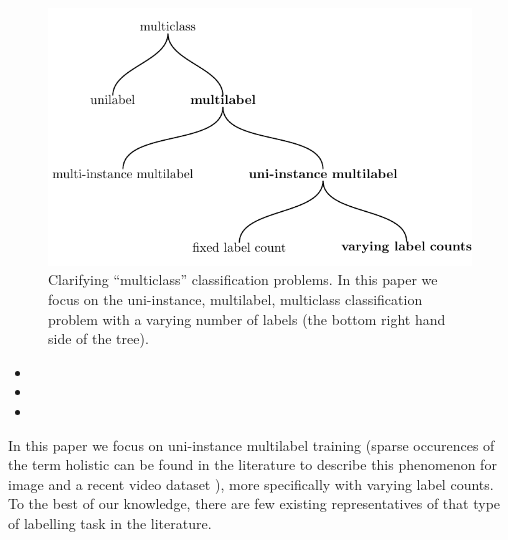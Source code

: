 \begin{figure}[t]
\centering
\includegraphics[width=.9\linewidth]{./tree/Tree.pdf}
\caption{\label{fig:tree}
Clarifying ``multiclass'' classification problems.
In this paper we focus on the uni-instance, multilabel, multiclass classification problem with a varying number of labels (the bottom right hand side of the tree).
}
\end{figure}



\begin{itemize}[leftmargin=*]
\item {}
\item {}
\item {}
\end{itemize}


\vspace*{3cm}

In this paper we focus on uni-instance multilabel training (sparse occurences of the term holistic can be found in the literature to describe this phenomenon for image \cite{holisticImageDescriptors,holisticLungs} and a recent video dataset \cite{holisticVideoData} ), more specifically with varying label counts. To the best of our knowledge, there are few existing representatives of that type of labelling task in the literature.  

